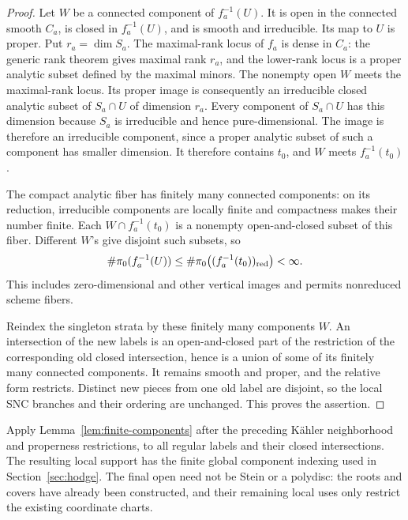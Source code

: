 \begin{proof}
Let \(W\) be a connected component of \(f_a^{-1}(U)\).  It is open in
the connected smooth \(C_a\), is closed in \(f_a^{-1}(U)\), and is
smooth and irreducible.  Its map to \(U\) is proper.  Put
\(r_a=\dim S_a\).  The maximal-rank locus of \(f_a\) is dense in \(C_a\):
the generic rank theorem gives maximal rank \(r_a\), and the lower-rank
locus is a proper analytic subset defined by the maximal minors.
The nonempty open \(W\) meets the maximal-rank locus.  Its proper image is consequently
an irreducible closed analytic subset of \(S_a\cap U\) of dimension
\(r_a\).  Every component of \(S_a\cap U\) has this dimension because
\(S_a\) is irreducible and hence pure-dimensional.  The image is therefore
an irreducible component, since a proper analytic subset of such a
component has smaller dimension.
It therefore contains \(t_0\), and \(W\) meets \(f_a^{-1}(t_0)\).

The compact analytic fiber has finitely many connected components:
on its reduction, irreducible components are locally finite and
compactness makes their number finite.  Each
\(W\cap f_a^{-1}(t_0)\) is a nonempty open-and-closed subset of this
fiber.  Different \(W\)'s give disjoint such subsets, so
\begin{equation}\label{eq:finite-fiber-components}
 \#\pi_0(f_a^{-1}(U))
 \leq \#\pi_0\bigl((f_a^{-1}(t_0))_{\mathrm{red}}\bigr)<\infty.
\end{equation}
This includes zero-dimensional and other vertical images and permits
nonreduced scheme fibers.

Reindex the singleton strata by these finitely many components \(W\).
An intersection of the new labels is an open-and-closed part of the
restriction of the corresponding old closed intersection, hence is a
union of some of its finitely many connected components.  It remains
smooth and proper, and the relative form restricts.  Distinct new pieces
from one old label are disjoint, so the local SNC branches and their
ordering are unchanged.  This proves the assertion.
\end{proof}

Apply Lemma~\ref{lem:finite-components} after the preceding K\"ahler
neighborhood and properness restrictions, to all regular labels and their
closed intersections.  The resulting local support has the finite global
component indexing used in Section~\ref{sec:hodge}.  The final open need
not be Stein or a polydisc: the roots and covers have already been
constructed, and their remaining local uses only restrict the existing
coordinate charts.

